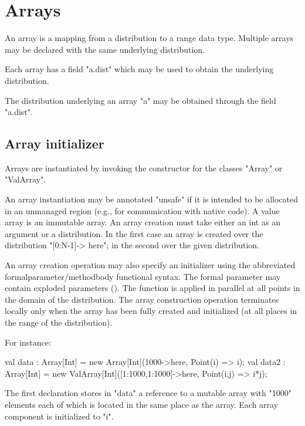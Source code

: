 \chapter{Arrays}\label{XtenArrays}

An array is a mapping from a distribution to a range data
type. Multiple arrays may be declared with the same underlying
distribution. 

Each array has a field \xcd"a.dist" which may be used to
obtain the underlying
distribution.

The distribution underlying an array \xcd"a" may be obtained through
the field \xcd"a.dist".



\section{Array initializer}\label{ArrayInitializer}\label{array!creation}

Arrays are instantiated by invoking the constructor for the
classes
\xcd"Array" or \xcd"ValArray".

An array instantiation may be annotated
\xcd"unsafe"
if it is intended to be
allocated in an unmanaged region (e.g., for communication with native
code). A value array is an immutable array. An array creation
must take either an int as an argument or a distribution. In the first
case an array is created over the distribution \xcd"[0:N-1]-> here";
in the second over the given distribution. 

An array creation operation may also specify an initializer using the
abbreviated formalparameter/methodbody functional syntax. The formal
parameter may contain exploded parameters
(). The function is applied in parallel
at all points in the domain of the distribution. The array
construction operation terminates locally only when the array has been
fully created and initialized (at all places in the range of the
distribution).

For instance:
\begin{xten}
val data : Array[Int]
    = new Array[Int](1000->here, Point(i) => i);
val data2 : Array[Int]
    = new ValArray[Int]([1:1000,1:1000]->here, Point(i,j) => i*j);
\end{xten}

{}\noindent 
The first declaration stores in \xcd"data" a reference to a mutable
array with \xcd"1000" elements each of which is located in the
same place as the array. Each array component is initialized to \xcd"i".


